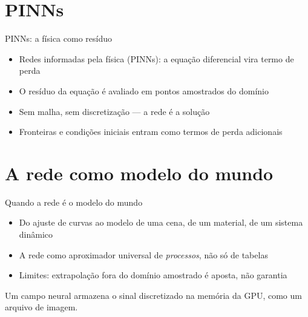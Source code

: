 \documentclass[aspectratio=169, 11pt]{beamer}
\begin{document}
\section{PINNs}

\begin{frame}{PINNs: a física como resíduo}
  \begin{itemize}\setlength{\itemsep}{0.4ex}
    \item Redes informadas pela física (PINNs): a equação diferencial vira
          termo de perda
    \item O resíduo da equação é avaliado em pontos amostrados do domínio
    \item Sem malha, sem discretização — a rede é a solução
    \item Fronteiras e condições iniciais entram como termos de perda
          adicionais
  \end{itemize}
\end{frame}

\section{A rede como modelo do mundo}

\begin{frame}{Quando a rede é o modelo do mundo}
  \begin{itemize}\setlength{\itemsep}{0.4ex}
    \item Do ajuste de curvas ao modelo de uma cena, de um material, de um
          sistema dinâmico
    \item A rede como aproximador universal de \emph{processos}, não só de
          tabelas
    \item Limites: extrapolação fora do domínio amostrado é aposta, não
          garantia
  \end{itemize}
  \begin{quizbox}
    Um campo neural armazena o sinal discretizado na memória da GPU, como um
    arquivo de imagem.

    \smallskip
  \end{quizbox}
\end{frame}
\end{document}
